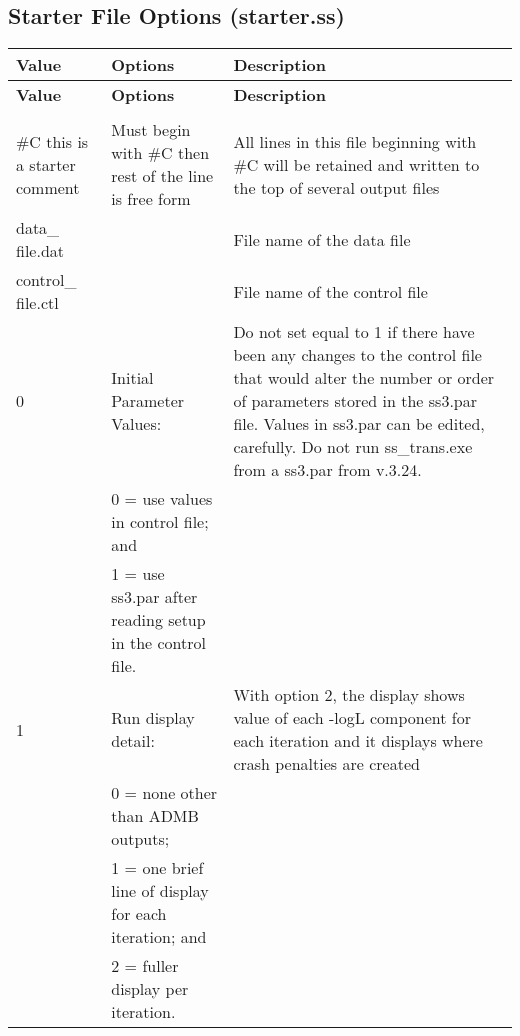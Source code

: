 {
\setlength\extrarowheight{4pt}
\begin{landscape}
\subsection{Starter File Options (starter.ss)}	

\begin{longtable}{p{1.5cm} p{7.2cm} p{12.3cm}} 

 \hline
 \textbf{Value} & \textbf{Options} & \textbf{Description} \TBstrut\\ 
 \hline
 \endfirsthead
 
 \hline
 \textbf{Value} & \textbf{Options} & \textbf{Description} \TBstrut\\ 
 \hline
 \endhead
 
 \hline
 \endfoot
 
 \hline
 \multicolumn{3}{c}{\textbf{End of Starter File}} \Tstrut\Bstrut\\
 \hline
 \endlastfoot

 \#C this is a starter comment & Must begin with \#C then rest of the line is free form & All lines in this file beginning with \#C will be retained and written to the top of several output files \Tstrut\\
		
 \hline
 data\_ file.dat &  & File name of the data file \Tstrut\\
		
 \hline
 control\_ file.ctl &  & File name of the control file \Tstrut\\
   
 \hline		
 0 & Initial Parameter Values: & \multirow{1}{1cm}[-0.25cm]{\parbox{12.5cm}{Do not set equal to 1 if there have been any changes to the control file that would alter the number or order of parameters stored in the ss3.par file. Values in ss3.par can be edited, carefully. Do not run ss\_trans.exe from a ss3.par from v.3.24.}}\Tstrut\\
 & 0 = use values in control file; and&  \\
 & 1 = use ss3.par after reading setup in the control file. & \\
		
 \hline
 1 & Run display detail: &  \multirow{1}{1cm}[-0.25cm]{\parbox{12.5cm}{With option 2, the display shows value of each -logL component for each iteration and it displays where crash penalties are created}} \Tstrut\\
   & 0 = none other than ADMB outputs; & \\
   & 1 = one brief line of display for each iteration; and & \\
   & 2 = fuller display per iteration. & \\
		  

\end{longtable}
\end{landscape}}
